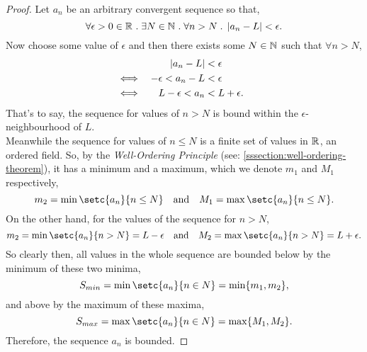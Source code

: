 \documentclass[../MathsNotesBase.tex]{subfiles}
\begin{document}
{		\bigskip
		\begin{proof}
			Let $a_n$ be an arbitrary convergent sequence so that,
			\[ \forall \epsilon > 0 \in \mathbb{R}^{} \;.\; \exists N \in \mathbb{N}^{} \;.\; \forall n > N \;.\; \left\lvert a_n - L\right\rvert < \epsilon. \]
			Now choose some value of $\epsilon$ and then there exists some ${ N \in \mathbb{N}^{} }$ such that ${ \forall n > N }$,
			\[\begin{aligned}
				&& \left\lvert a_n - L\right\rvert &< \epsilon \\
				&\iff & -\epsilon < a_n - L &< \epsilon  &\text{\scriptsize{}} \\
				&\iff & L - \epsilon < a_n &< L + \epsilon.
			\end{aligned}\]
			That's to say, the sequence for values of ${ n > N }$ is bound within the $\epsilon$-neighbourhood of $L$.\\
			
			Meanwhile the sequence for values of ${ n \leq N }$ is a finite set of values in $\mathbb{R}^{}$, an ordered field. So, by the \textit{Well-Ordering Principle} (see: \ref{sssection:well-ordering-theorem}), it has a minimum and a maximum, which we denote $m_1$ and $M_1$ respectively,
				\[ m_2 = \min \setc{a_n}{n \leq N}  \eqand  M_1 = \max \setc{a_n}{n \leq N}. \]
			On the other hand, for the values of the sequence for ${ n > N }$,
				\[ m_2 = \min \setc{a_n}{n > N} = L - \epsilon \eqand M_2 = \max \setc{a_n}{n > N} = L + \epsilon. \]
			So clearly then, all values in the whole sequence are bounded below by the minimum of these two minima,
				\[ S_{min} = \min \setc{a_n}{n \in N} = \min \{m_1, m_2\}, \]
			and above by the maximum of these maxima,
				\[ S_{max} = \max \setc{a_n}{n \in N} = \max \{M_1, M_2\}. \]
			Therefore, the sequence $a_n$ is bounded.
		\end{proof}
		
}
\end{document}
